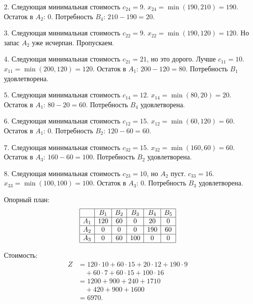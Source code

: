 \documentclass{article}
\begin{document}
2. Следующая минимальная стоимость \( c_{24} = 9 \).  
   \( x_{24} = \min(190, 210) = 190 \).  
   Остаток в \( A_2 \): 0.  
   Потребность \( B_4 \): \( 210 - 190 = 20 \).  

3. Следующая минимальная стоимость \( c_{22} = 9 \).  
   \( x_{22} = \min(190, 120) = 120 \).  
   Но запас \( A_2 \) уже исчерпан. Пропускаем.  

4. Следующая минимальная стоимость \( c_{21} = 21 \), но это дорого.  
   Лучше \( c_{11} = 10 \).  
   \( x_{11} = \min(200, 120) = 120 \).  
   Остаток в \( A_1 \): \( 200 - 120 = 80 \).  
   Потребность \( B_1 \) удовлетворена.  

5. Следующая минимальная стоимость \( c_{14} = 12 \).  
   \( x_{14} = \min(80, 20) = 20 \).  
   Остаток в \( A_1 \): \( 80 - 20 = 60 \).  
   Потребность \( B_4 \) удовлетворена.  

6. Следующая минимальная стоимость \( c_{12} = 15 \).  
   \( x_{12} = \min(60, 120) = 60 \).  
   Остаток в \( A_1 \): 0.  
   Потребность \( B_2 \): \( 120 - 60 = 60 \).  

7. Следующая минимальная стоимость \( c_{32} = 15 \).  
   \( x_{32} = \min(160, 60) = 60 \).  
   Остаток в \( A_3 \): \( 160 - 60 = 100 \).  
   Потребность \( B_2 \) удовлетворена.  

8. Следующая минимальная стоимость \( c_{23} = 10 \), но \( A_2 \) пуст.  
   \( c_{33} = 16 \).  
   \( x_{33} = \min(100, 100) = 100 \).  
   Остаток в \( A_3 \): 0.  
   Потребность \( B_3 \) удовлетворена.  

Опорный план:  
\[
\begin{array}{|c|c|c|c|c|c|}
\hline
 & B_1 & B_2 & B_3 & B_4 & B_5 \\
\hline
A_1 & 120 & 60 & 0 & 20 & 0 \\
\hline
A_2 & 0 & 0 & 0 & 190 & 60 \\
\hline
A_3 & 0 & 60 & 100 & 0 & 0 \\
\hline
\end{array}
\]

Стоимость:  
\begin{align}
Z &= 120 \cdot 10 + 60 \cdot 15 + 20 \cdot 12 + 190 \cdot 9 \nonumber \\
   &\quad + 60 \cdot 7 + 60 \cdot 15 + 100 \cdot 16 \nonumber \\
   &= 1200 + 900 + 240 + 1710 \nonumber \\
   &\quad + 420 + 900 + 1600 \nonumber \\
   &= 6970.
\end{align}
\end{document}

